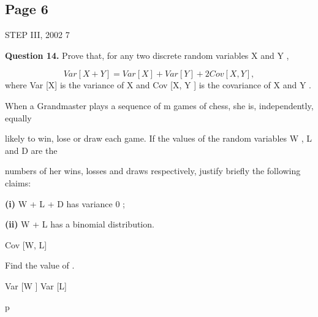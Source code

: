 \documentclass[12pt]{article}
\begin{document}
\subsection*{Page 6}
\begin{flushleft}
STEP III, 2002 7\par
\bigskip\textbf{Question 14.} Prove that, for any two discrete random variables X and Y ,\par
\[Var [X + Y ] = Var [X] + Var [Y ] + 2 Cov [X, Y ] ,\]
where Var [X] is the variance of X and Cov [X, Y ] is the covariance of X and Y .\par
When a Grandmaster plays a sequence of m games of chess, she is, independently, equally\par
likely to win, lose or draw each game. If the values of the random variables W , L and D are the\par
numbers of her wins, losses and draws respectively, justify briefly the following claims:\par
\textbf{(i)} W + L + D has variance 0 ;\par
\textbf{(ii)} W + L has a binomial distribution.\par
Cov [W, L]\par
Find the value of .\par
Var [W ] Var [L]\par
p\par
\end{flushleft}
\end{document}
